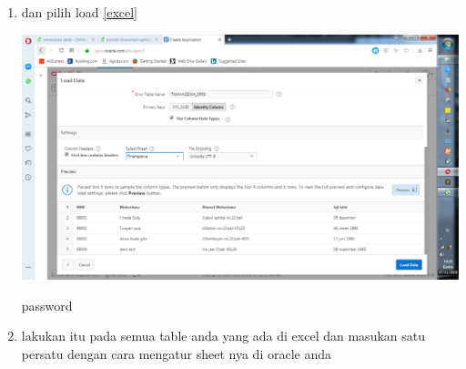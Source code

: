 \documentclass{article}
\begin{document}
\begin{enumerate}
      \item dan pilih load
      \ref{excel}
    \begin{center}
         \centering
            \includegraphics[scale=0.27]{gambar/11.png}
        \caption{password}
        \label{excel}
    \end{center}    
    
          \item lakukan itu pada semua table anda yang ada di excel dan masukan satu persatu dengan cara mengatur sheet nya di oracle anda


    
\end{enumerate}
\end{document}
